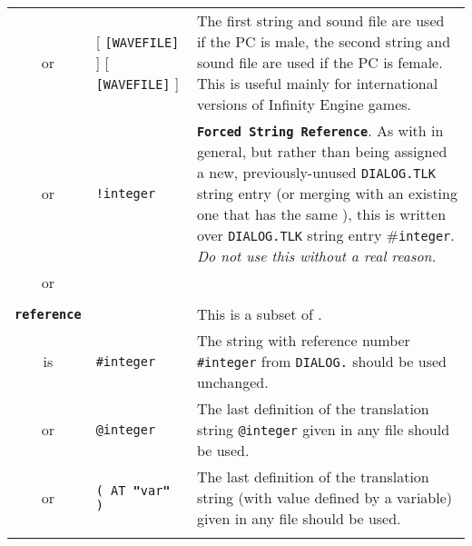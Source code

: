 \documentclass{article}
\def\ttref#1{\ahrefloc{#1}{\tt #1}}
\def\DEFINE#1{{\tt \bf #1}\label{#1}\index{#1}}
\def\t#1{{\tt #1}}
\def\Ob{{\color{red} [ }}
\def\Oe{{\color{red} ] }}
\begin{document}
\begin{tabular}{cp{10in}|p{10in}}
or & \ttref{String} \Ob \t{[WAVEFILE]} \Oe \ttref{String} \Ob \t{[WAVEFILE]} \Oe &
The first string and sound file are used if the PC is male, the second
string and sound file are used if the PC is female. This is useful mainly
for international versions of Infinity Engine games. \\

or & \t{!integer} \ttref{text} & \DEFINE{Forced String Reference}. As with
\ttref{text} in general, but rather than being assigned a new,
previously-unused \t{DIALOG.TLK} string entry (or merging with an existing
one that has the same \ttref{text}), this \ttref{text} is written over
\t{DIALOG.TLK} string entry \#\t{integer}. \emph{Do not use this without a real reason.}
\\
or & \ttref{reference} & \\

\\

\DEFINE{reference} & & This is a subset of \ttref{text}. \\
is & \t{\#integer} & The string with reference number \t{\#integer} from
\t{DIALOG.}\ttref{TLK} should be used unchanged. \\

or & \t{@integer} & The last definition of the translation string
\t{@integer} given in any \ttref{TRA} file should be used.\\

or & \t{( AT {\bf{"}}var{\bf{"}} )} & The last definition of the translation string
(with value defined by a variable) given in any \ttref{TRA} file should be used.\\

\\


\end{tabular}
\end{document}
